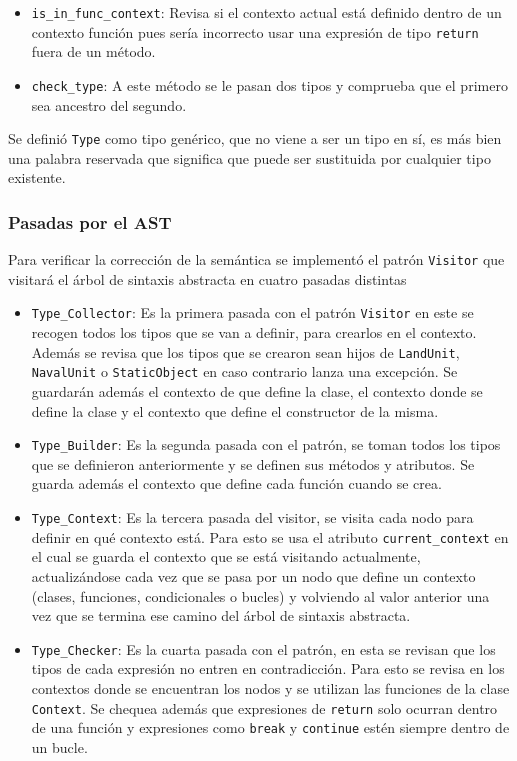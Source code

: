 \begin{itemize}
\begin{itemize}
	\item \verb|is_in_func_context|: Revisa si el contexto actual está definido dentro de un contexto función pues sería incorrecto usar una expresión de tipo \verb|return| fuera de un método. 
	
	\item \verb|check_type|: A este método se le pasan dos tipos y comprueba que el primero sea ancestro del segundo.

	
\end{itemize}

\end{itemize}

Se definió \verb|Type| como tipo genérico, que no viene a ser un tipo en sí, es más bien una palabra reservada que significa que puede ser sustituida por cualquier tipo existente.

\subsubsection{Pasadas por el AST}
Para verificar la correcci\'on de la sem\'antica se implement\'o el patr\'on \verb|Visitor| que visitar\'a el \'arbol de sintaxis abstracta en cuatro pasadas distintas
\begin{itemize}
\item \verb|Type_Collector|: Es la primera pasada con el patr\'on \verb|Visitor| en este se recogen todos los tipos que se van a definir, para crearlos en el contexto. Además se revisa que los tipos que se crearon sean hijos de  \verb|LandUnit|, \verb|NavalUnit| o \verb|StaticObject| en caso contrario lanza una excepción. Se guardarán además el contexto de que define la clase, el contexto donde se define la clase y el contexto que define el constructor de la misma.

\item \verb|Type_Builder|: Es la segunda pasada con el patr\'on, se toman todos los tipos que se definieron anteriormente y se definen sus m\'etodos y atributos. Se guarda además el contexto que define cada función cuando se crea.

\item \verb|Type_Context|: Es la tercera pasada del visitor, se visita cada nodo para definir en qu\'e contexto est\'a. Para esto se usa el atributo \verb|current_context| en el cual se guarda el contexto que se está visitando actualmente, actualizándose cada vez que se pasa por un nodo que define un contexto (clases, funciones, condicionales o bucles) y volviendo al valor anterior una vez que se termina ese camino del \'arbol de sintaxis abstracta. 

\item \verb|Type_Checker|: Es la cuarta pasada con el patr\'on, en esta se revisan que los tipos de cada expresi\'on no entren en contradicci\'on. Para esto se revisa en los contextos donde se encuentran los nodos y se utilizan las funciones de la clase \verb|Context|. Se chequea adem\'as que expresiones de \verb|return| solo ocurran dentro de una función y expresiones como \verb|break| y \verb|continue| estén siempre dentro de un bucle.


\end{itemize}

